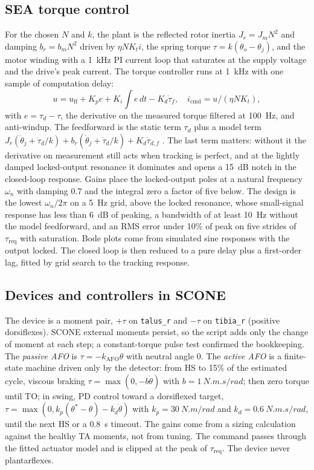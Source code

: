 \subsection{SEA torque control}
For the chosen $N$ and $k$, the plant is the reflected rotor inertia $J_r = J_m N^2$ and damping $b_r = b_m N^2$ driven by $\eta N K_t i$, the spring torque $\tau = k(\theta_o - \theta_j)$, and the motor winding with a \SI{1}{kHz} PI current loop that saturates at the supply voltage and the drive's peak current. The torque controller runs at \SI{1}{kHz} with one sample of computation delay:
\begin{equation}
u = u_\text{ff} + K_p e + K_i\!\int\! e\,dt - K_d \dot\tau_f,\quad i_\text{cmd} = u / (\eta N K_t),
\end{equation}
with $e = \tau_d - \tau$, the derivative on the measured torque filtered at \SI{100}{Hz}, and anti-windup. The feedforward is the static term $\tau_d$ plus a model term $J_r(\ddot\theta_j + \ddot\tau_d/k) + b_r(\dot\theta_j + \dot\tau_d/k) + K_d\dot\tau_{d,f}$ \cite{vallery2007,paine2014}. The last term matters: without it the derivative on measurement still acts when tracking is perfect, and at the lightly damped locked-output resonance it dominates and opens a 15~dB notch in the closed-loop response. Gains place the locked-output poles at a natural frequency $\omega_n$ with damping 0.7 and the integral zero a factor of five below. The design is the lowest $\omega_n/2\pi$ on a 5~Hz grid, above the locked resonance, whose small-signal response has less than 6~dB of peaking, a bandwidth of at least 10~Hz without the model feedforward, and an RMS error under 10\% of peak on five strides of $\tau_\text{req}$ with saturation. Bode plots come from simulated sine responses with the output locked. The closed loop is then reduced to a pure delay plus a first-order lag, fitted by grid search to the tracking response.

\subsection{Devices and controllers in SCONE}
The device is a moment pair, $+\tau$ on \texttt{talus\_r} and $-\tau$ on \texttt{tibia\_r} (positive dorsiflexes). SCONE external moments persist, so the script adds only the change of moment at each step; a constant-torque pulse test confirmed the bookkeeping. The \emph{passive AFO} is $\tau = -k_\text{AFO}\theta$ with neutral angle 0. The \emph{active AFO} is a finite-state machine driven only by the detector: from HS to 15\% of the estimated cycle, viscous braking $\tau = \max(0, -b\dot\theta)$ with $b = \SI{1}{N.m.s/rad}$; then zero torque until TO; in swing, PD control toward a dorsiflexed target, $\tau = \max(0, k_p(\theta^* - \theta) - k_d\dot\theta)$ with $k_p = \SI{30}{N.m/rad}$ and $k_d = \SI{0.6}{N.m.s/rad}$, until the next HS or a 0.8~s timeout. The gains come from a sizing calculation against the healthy TA moments, not from tuning. The command passes through the fitted actuator model and is clipped at the peak of $\tau_\text{req}$. The device never plantarflexes.

